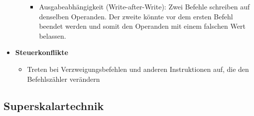 \begin{itemize}
\begin{itemize}
\begin{itemize}
			\item Ausgabeabhängigkeit (Write-after-Write): Zwei Befehle schreiben auf denselben Operanden. Der zweite könnte vor dem ersten Befehl beendet werden und somit den Operanden mit einem falschen Wert belassen.
		\end{itemize}
	\end{itemize}
	\item \textbf{Steuerkonflikte}
	\begin{itemize}
		\item Treten bei Verzweigungsbefehlen und anderen Instruktionen auf, die den Befehlszähler verändern
	\end{itemize}
\end{itemize}


\subsection{Superskalartechnik}

